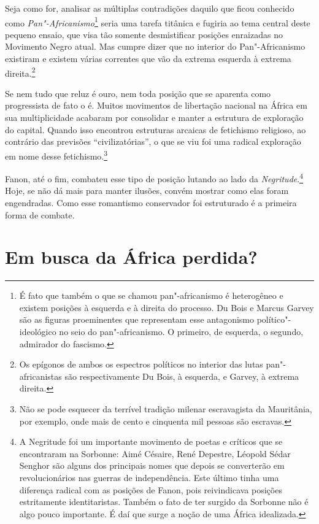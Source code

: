 Seja como for, analisar as múltiplas contradições daquilo que ficou
conhecido como \emph{Pan"-Africanismo}\footnote{É fato que também o que
  se chamou pan"-africanismo é heterogêneo e existem posições à esquerda
  e à direita do processo. Du Bois e Marcus Garvey são as figuras
  proeminentes que representam esse antagonismo político"-ideológico no
  seio do pan"-africanismo. O primeiro, de esquerda, o segundo, admirador
  do fascismo.} seria uma tarefa titânica e fugiria ao tema central
deste pequeno ensaio, que visa tão somente desmistificar posições
enraizadas no Movimento Negro atual. Mas cumpre dizer que no interior do
Pan"-Africanismo existiram e existem várias correntes que vão da extrema
esquerda à extrema direita.\footnote{Os epígonos de ambos os espectros
  políticos no interior das lutas pan"-africanistas são respectivamente
  Du Bois, à esquerda, e Garvey, à extrema direita.}

Se nem tudo que reluz é ouro, nem toda posição que se aparenta como
progressista de fato o é. Muitos movimentos de libertação nacional na
África em sua multiplicidade acabaram por consolidar e manter a
estrutura de exploração do capital. Quando isso encontrou estruturas
arcaicas de fetichismo religioso, ao contrário das previsões
``civilizatórias'', o que se viu foi uma radical exploração em nome
desse fetichismo.\footnote{Não se pode esquecer da terrível tradição
  milenar escravagista da Mauritânia, por exemplo, onde mais de cento e
  cinquenta mil pessoas são escravas.}

Fanon, até o fim, combateu esse tipo de posição lutando ao lado da
\emph{Negritude}.\footnote{A Negritude foi um importante movimento de
  poetas e críticos que se encontraram na Sorbonne: Aimé Césaire, René
  Depestre, Léopold Sédar Senghor são alguns dos principais nomes que
  depois se converterão em revolucionários nas guerras de independência.
  Este último tinha uma diferença radical com as posições de Fanon, pois
  reivindicava posições estritamente identitaristas. Também o fato de
  ter surgido da Sorbonne não é algo pouco importante. É daí que surge a
  noção de uma África idealizada.} Hoje, se não dá mais para manter
ilusões, convém mostrar como elas foram engendradas. Como esse
romantismo conservador foi estruturado é a primeira forma de combate.

\chapter{Em busca da África perdida?}

